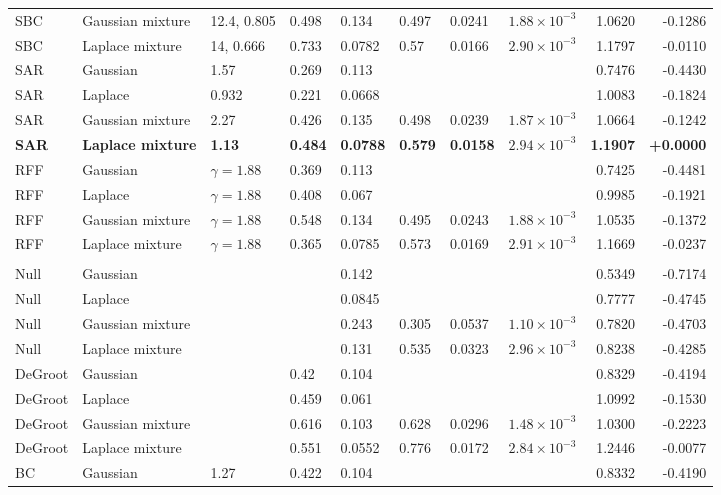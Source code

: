 \begin{longtable}{llllllllrr}
SBC & Gaussian mixture & 12.4, 0.805 & 0.498 & 0.134 & 0.497 & 0.0241 & $1.88\times10^{-3}$ & 1.0620 & -0.1286 \\
SBC & Laplace mixture & 14, 0.666 & 0.733 & 0.0782 & 0.57 & 0.0166 & $2.90\times10^{-3}$ & 1.1797 & -0.0110 \\
SAR & Gaussian & 1.57 & 0.269 & 0.113 &  &  &  & 0.7476 & -0.4430 \\
SAR & Laplace & 0.932 & 0.221 & 0.0668 &  &  &  & 1.0083 & -0.1824 \\
SAR & Gaussian mixture & 2.27 & 0.426 & 0.135 & 0.498 & 0.0239 & $1.87\times10^{-3}$ & 1.0664 & -0.1242 \\
\textbf{SAR} & \textbf{Laplace mixture} & \textbf{1.13} & \textbf{0.484} & \textbf{0.0788} & \textbf{0.579} & \textbf{0.0158} & \textbf{$2.94\times10^{-3}$} & \textbf{1.1907} & \textbf{+0.0000} \\
RFF & Gaussian & $\gamma=1.88$ & 0.369 & 0.113 &  &  &  & 0.7425 & -0.4481 \\
RFF & Laplace & $\gamma=1.88$ & 0.408 & 0.067 &  &  &  & 0.9985 & -0.1921 \\
RFF & Gaussian mixture & $\gamma=1.88$ & 0.548 & 0.134 & 0.495 & 0.0243 & $1.88\times10^{-3}$ & 1.0535 & -0.1372 \\
RFF & Laplace mixture & $\gamma=1.88$ & 0.365 & 0.0785 & 0.573 & 0.0169 & $2.91\times10^{-3}$ & 1.1669 & -0.0237 \\
\midrule
\multicolumn{10}{l}{\adamsHi{}} \\
Null & Gaussian &  &  & 0.142 &  &  &  & 0.5349 & -0.7174 \\
Null & Laplace &  &  & 0.0845 &  &  &  & 0.7777 & -0.4745 \\
Null & Gaussian mixture &  &  & 0.243 & 0.305 & 0.0537 & $1.10\times10^{-3}$ & 0.7820 & -0.4703 \\
Null & Laplace mixture &  &  & 0.131 & 0.535 & 0.0323 & $2.96\times10^{-3}$ & 0.8238 & -0.4285 \\
DeGroot & Gaussian &  & 0.42 & 0.104 &  &  &  & 0.8329 & -0.4194 \\
DeGroot & Laplace &  & 0.459 & 0.061 &  &  &  & 1.0992 & -0.1530 \\
DeGroot & Gaussian mixture &  & 0.616 & 0.103 & 0.628 & 0.0296 & $1.48\times10^{-3}$ & 1.0300 & -0.2223 \\
DeGroot & Laplace mixture &  & 0.551 & 0.0552 & 0.776 & 0.0172 & $2.84\times10^{-3}$ & 1.2446 & -0.0077 \\
BC & Gaussian & 1.27 & 0.422 & 0.104 &  &  &  & 0.8332 & -0.4190 \\

\end{longtable}
